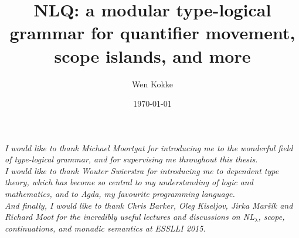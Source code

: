 \documentclass[a4paper]{article}
\title{NLQ: a modular type-logical grammar for quantifier movement,
  scope islands, and more}
\author{Wen Kokke}
\date{\today}
\begin{document}
\clearpage

\vspace*{\fill}
\begin{center}\itshape
  \noindent
  I would like to thank Michael Moortgat for introducing me to the
  wonderful field of type-logical grammar, and for supervising me
  throughout this thesis.
  \\[1\baselineskip]

  \noindent
  I would like to thank Wouter Swierstra for introducing me to
  dependent type theory, which has become so central to my
  understanding of logic and mathematics, and to Agda, my favourite
  programming language.
  \\[1\baselineskip]

  \noindent
  And finally, I would like to thank Chris Barker, Oleg Kiseljov,
  Jirka Maršík and Richard Moot for the incredibly useful lectures and
  discussions on NL$_{\lambda}$, scope, continuations, and monadic
  semantics at ESSLLI 2015.
  \\[1\baselineskip]
\end{center}
\vspace*{\fill}
\tableofcontents
\clearpage








%

\renewcommand\thesection{A}

\renewcommand\thesection{B}

\end{document}
